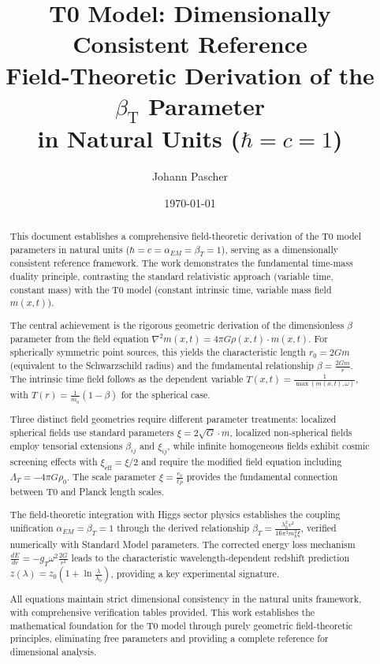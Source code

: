 \documentclass[12pt,a4paper]{article}
\newcommand{\betaT}{\beta_{\text{T}}}
\begin{document}
	
	\title{T0 Model: Dimensionally Consistent Reference \\
		Field-Theoretic Derivation of the $\betaT$ Parameter \\
		in Natural Units ($\hbar = c = 1$)}
	\author{Johann Pascher}
	\date{\today}
	
	\maketitle
	\begin{abstract}
		This document establishes a comprehensive field-theoretic derivation of the T0 model parameters in natural units ($\hbar = c = \alpha_{EM} = \beta_T = 1$), serving as a dimensionally consistent reference framework. The work demonstrates the fundamental time-mass duality principle, contrasting the standard relativistic approach (variable time, constant mass) with the T0 model (constant intrinsic time, variable mass field $m(x,t)$). 
		
		The central achievement is the rigorous geometric derivation of the dimensionless $\beta$ parameter from the field equation $\nabla^2 m(x,t) = 4\pi G \rho(x,t) \cdot m(x,t)$. For spherically symmetric point sources, this yields the characteristic length $r_0 = 2Gm$ (equivalent to the Schwarzschild radius) and the fundamental relationship $\beta = \frac{2Gm}{r}$. The intrinsic time field follows as the dependent variable $T(x,t) = \frac{1}{\max(m(x,t), \omega)}$, with $T(r) = \frac{1}{m_0}(1-\beta)$ for the spherical case.
		
		Three distinct field geometries require different parameter treatments: localized spherical fields use standard parameters $\xi = 2\sqrt{G} \cdot m$, localized non-spherical fields employ tensorial extensions $\beta_{ij}$ and $\xi_{ij}$, while infinite homogeneous fields exhibit cosmic screening effects with $\xi_{\text{eff}} = \xi/2$ and require the modified field equation including $\Lambda_T = -4\pi G \rho_0$. The scale parameter $\xi = \frac{r_0}{\ell_P}$ provides the fundamental connection between T0 and Planck length scales.
		
		The field-theoretic integration with Higgs sector physics establishes the coupling unification $\alpha_{EM} = \beta_T = 1$ through the derived relationship $\beta_T = \frac{\lambda_h^2 v^2}{16\pi^3 m_h^2 \xi}$, verified numerically with Standard Model parameters. The corrected energy loss mechanism $\frac{dE}{dr} = -g_T \omega^2 \frac{2G}{r^2}$ leads to the characteristic wavelength-dependent redshift prediction $z(\lambda) = z_0(1 + \ln\frac{\lambda}{\lambda_0})$, providing a key experimental signature.
		
		All equations maintain strict dimensional consistency in the natural units framework, with comprehensive verification tables provided. This work establishes the mathematical foundation for the T0 model through purely geometric field-theoretic principles, eliminating free parameters and providing a complete reference for dimensional analysis.

	\end{abstract}
	
\end{document}
